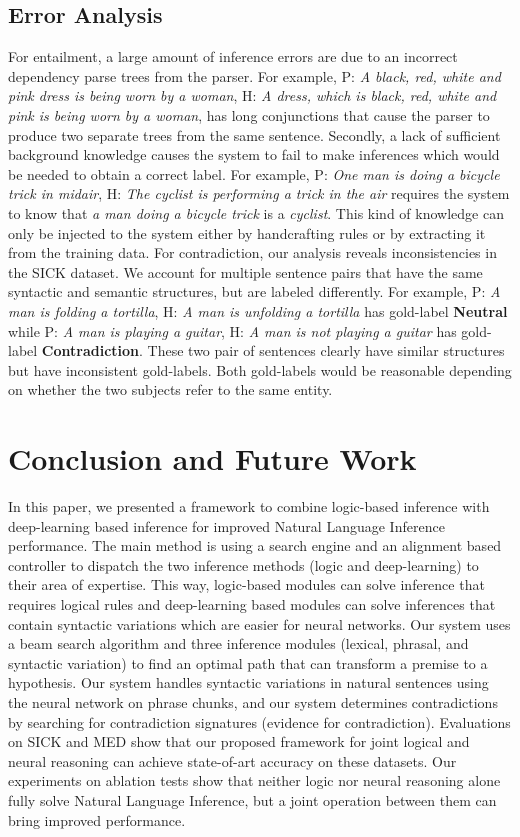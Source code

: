 \documentclass[11pt,a4paper]{article}
\begin{document}
\subsection{Error Analysis} 
For entailment, a large amount of inference errors are due to an incorrect dependency parse trees from the parser. For example, P: \textit{A black, red, white and pink dress is being worn by a woman}, H: \textit{A dress, which is black, red, white and pink is being worn by a woman}, has long conjunctions that cause the parser to produce two separate trees from the same sentence. Secondly, a lack of sufficient background knowledge causes the system to fail to make
inferences which would be needed to obtain a correct label. 
For example, P: \textit{One man is doing a bicycle trick in midair}, H: \textit{The cyclist is performing a trick in the air} requires the system to know that \textit{a man doing a bicycle trick} is a \textit{cyclist}. This kind of knowledge can only be injected to the system either by handcrafting rules or by extracting it from the training data. 
For contradiction, our analysis reveals inconsistencies in the SICK dataset. We account for multiple sentence pairs that have the same syntactic and semantic structures, but are labeled differently. For example, P: \textit{A man is folding a tortilla}, H: \textit{A man is unfolding a tortilla} has gold-label \textbf{Neutral} while P: \textit{A man is playing a guitar}, H: \textit{A man is not playing a guitar} has gold-label \textbf{Contradiction}. These two pair of sentences clearly have similar structures but have inconsistent gold-labels. Both gold-labels would be reasonable depending on whether the two subjects refer to the same entity. 
 
\section{Conclusion and Future Work}
In this paper, we presented a framework to combine logic-based inference with deep-learning based inference for improved Natural Language Inference performance. The main method is using a search engine and an alignment based controller to dispatch the two inference methods (logic and deep-learning) to their area of expertise. This way, logic-based modules can solve inference that requires logical rules and deep-learning based modules can solve inferences that contain syntactic variations which are easier for neural networks. Our system uses a beam search algorithm and three inference modules (lexical, phrasal, and syntactic variation) to find an optimal path that can transform a premise to a hypothesis. Our system handles syntactic variations in natural sentences using the neural network on phrase chunks, and our system determines contradictions by searching for contradiction signatures (evidence for contradiction). Evaluations on SICK and MED show that our proposed framework for joint logical and neural reasoning can achieve state-of-art accuracy on these datasets. Our experiments on ablation tests show that
neither logic nor neural reasoning alone fully solve Natural Language Inference, but a joint operation between them can bring improved performance. 
\end{document}
